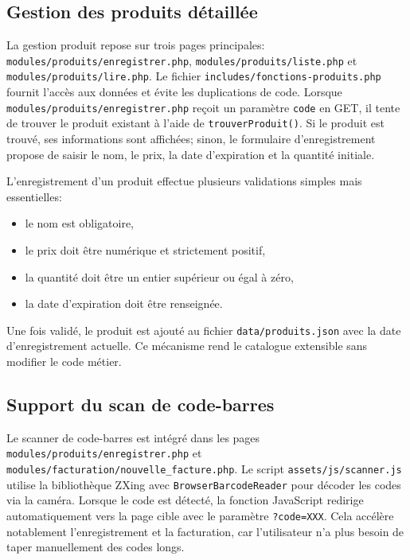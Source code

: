 \documentclass[12pt,a4paper]{article}
\begin{document}
\subsection{Gestion des produits détaillée}
La gestion produit repose sur trois pages principales: \texttt{modules/produits/enregistrer.php}, \texttt{modules/produits/liste.php} et \texttt{modules/produits/lire.php}. Le fichier \texttt{includes/fonctions-produits.php} fournit l'accès aux données et évite les duplications de code.
Lorsque \texttt{modules/produits/enregistrer.php} reçoit un paramètre \texttt{code} en GET, il tente de trouver le produit existant à l'aide de \texttt{trouverProduit()}. Si le produit est trouvé, ses informations sont affichées; sinon, le formulaire d'enregistrement propose de saisir le nom, le prix, la date d'expiration et la quantité initiale.

L'enregistrement d'un produit effectue plusieurs validations simples mais essentielles:
\begin{itemize}
  \item le nom est obligatoire,
  \item le prix doit être numérique et strictement positif,
  \item la quantité doit être un entier supérieur ou égal à zéro,
  \item la date d'expiration doit être renseignée.
\end{itemize}

Une fois validé, le produit est ajouté au fichier \texttt{data/produits.json} avec la date d'enregistrement actuelle. Ce mécanisme rend le catalogue extensible sans modifier le code métier.

\newpage

\subsection{Support du scan de code-barres}
Le scanner de code-barres est intégré dans les pages \texttt{modules/produits/enregistrer.php} et \texttt{modules/facturation/nouvelle\_facture.php}. Le script \texttt{assets/js/scanner.js} utilise la bibliothèque ZXing avec \texttt{BrowserBarcodeReader} pour décoder les codes via la caméra.
Lorsque le code est détecté, la fonction JavaScript redirige automatiquement vers la page cible avec le paramètre \texttt{?code=XXX}. Cela accélère notablement l'enregistrement et la facturation, car l'utilisateur n'a plus besoin de taper manuellement des codes longs.
\end{document}
